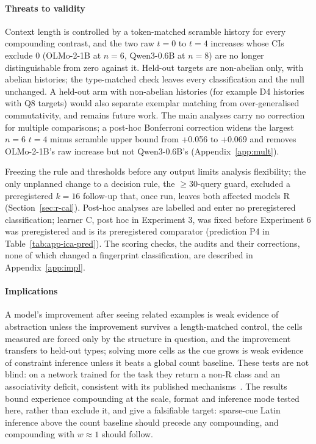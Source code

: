 \documentclass[11pt]{article}
\begin{document}
\paragraph{Threats to validity}

Context length is controlled by a token-matched scramble history for every compounding contrast, and the two raw $t = 0$ to $t = 4$ increases whose CIs exclude 0 (OLMo-2-1B at $n = 6$, Qwen3-0.6B at $n = 8$) are no longer distinguishable from zero against it. Held-out targets are non-abelian only, with abelian histories; the type-matched check leaves every classification and the null unchanged. A held-out arm with non-abelian histories (for example D4 histories with Q8 targets) would also separate exemplar matching from over-generalised commutativity, and remains future work. The main analyses carry no correction for multiple comparisons; a post-hoc Bonferroni correction widens the largest $n = 6$ $t = 4$ minus scramble upper bound from +0.056 to +0.069 and removes OLMo-2-1B's raw increase but not Qwen3-0.6B's (Appendix~\ref{app:mult}).

Freezing the rule and thresholds before any output limits analysis flexibility; the only unplanned change to a decision rule, the $\geq 30$-query guard, excluded a preregistered $k = 16$ follow-up that, once run, leaves both affected models R (Section~\ref{sec:r-cal}). Post-hoc analyses are labelled and enter no preregistered classification; learner C, post hoc in Experiment 3, was fixed before Experiment 6 was preregistered and is its preregistered comparator (prediction P4 in Table~\ref{tab:app-ica-pred}). The scoring checks, the audits and their corrections, none of which changed a fingerprint classification, are described in Appendix~\ref{app:impl}.

\paragraph{Implications}

A model's improvement after seeing related examples is weak evidence of abstraction unless the improvement survives a length-matched control, the cells measured are forced only by the structure in question, and the improvement transfers to held-out types; solving more cells as the cue grows is weak evidence of constraint inference unless it beats a global count baseline. These tests are not blind: on a network trained for the task they return a non-R class and an associativity deficit, consistent with its published mechanisms~\cite{todd2026ica}. The results bound experience compounding at the scale, format and inference mode tested here, rather than exclude it, and give a falsifiable target: sparse-cue Latin inference above the count baseline should precede any compounding, and compounding with $w \approx 1$ should follow.
\end{document}
